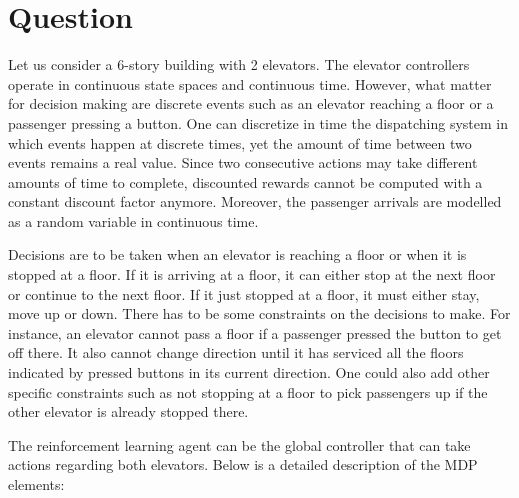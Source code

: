 \documentclass[a4paper]{article}
\begin{document}
\section{Question}

Let us consider a 6-story building with 2 elevators. The elevator controllers operate in continuous state spaces and continuous time. However, what matter for decision making are discrete events such as an elevator reaching a floor or a passenger pressing a button. One can discretize in time the dispatching system in which events happen at discrete times, yet the amount of time between two events remains a real value. Since two consecutive actions may take different amounts of time to complete, discounted rewards cannot be computed with a constant discount factor anymore. Moreover, the passenger arrivals are modelled as a random variable in continuous time.

Decisions are to be taken when an elevator is reaching a floor or when it is stopped at a floor. If it is arriving at a floor, it can either stop at the next floor or continue to the next floor. If it just stopped at a floor, it must either stay, move up or down. There has to be some constraints on the decisions to make. For instance, an elevator cannot pass a floor if a passenger pressed the button to get off there. It also cannot change direction until it has serviced all the floors indicated by pressed buttons in its current direction. One could also add other specific constraints such as not stopping at a floor to pick passengers up if the other elevator is already stopped there.

The reinforcement learning agent can be the global controller that can take actions regarding both elevators. Below is a detailed description of the MDP elements:
\end{document}
